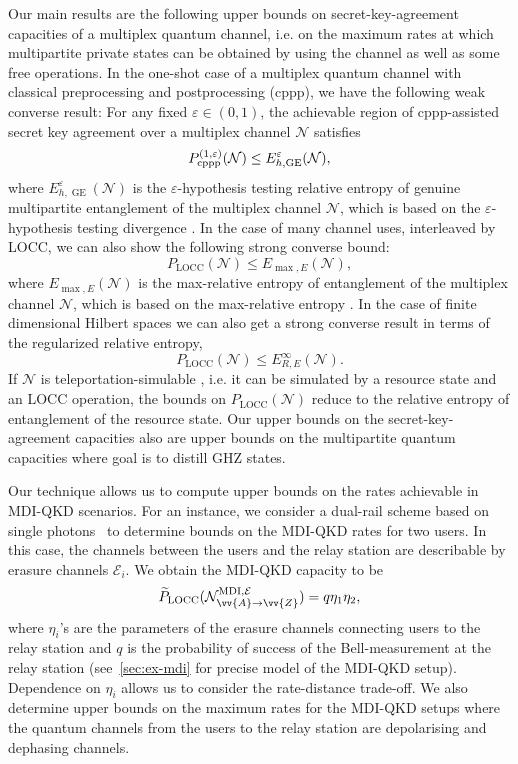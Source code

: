 \documentclass[aps,pra,twocolumn,superscriptaddress,longbibliography]{revtex4-1}
\def\GE{\operatorname{GE}}
\def\LOCC{\operatorname{LOCC}}
\newcommand{\mc}[1]{\mathcal{#1}}
\newcommand{\wt}[1]{\widetilde{#1}}
\begin{document}
Our main results are the following upper bounds  on secret-key-agreement capacities of a multiplex quantum channel, i.e. on the maximum rates at which multipartite private states can be obtained by using the channel as well as some free operations. In the one-shot case of a multiplex quantum channel with classical preprocessing and postprocessing (cppp), we have the following weak converse result: For any fixed $\varepsilon\in(0,1)$, the achievable region of cppp-assisted secret key agreement over a multiplex channel $\mc{N}$ satisfies 
\begin{equation}
P_{\textnormal{cppp}}^{(1,\varepsilon)}(\mc{N})\leq E^\varepsilon_{h,\GE}(\mc{N}),
\end{equation} 
where $E^\varepsilon_{h,\GE}(\mc{N})$ is the $\varepsilon$-hypothesis testing relative entropy of genuine multipartite entanglement of the multiplex channel $\mc{N}$, which is based on the $\varepsilon$-hypothesis testing divergence \cite{BD10}. In the case of many channel uses, interleaved by LOCC, we can also show the following strong converse bound:
\begin{equation}
P_{\LOCC}(\mc{N})\leq E_{\max,E}(\mc{N}), 
\end{equation}
where $E_{\max,E}(\mc{N})$ is the max-relative entropy of entanglement of the multiplex channel $\mc{N}$, which is based on the max-relative entropy \cite{Dat09}. In the case of finite dimensional Hilbert spaces we can also get a strong converse result in terms of the regularized relative entropy,
\begin{equation}
P_{\LOCC}(\mc{N})\leq E^{\infty}_{R,E}(\mc{N}).
\end{equation}
If $\mc{N}$ is teleportation-simulable \cite{BBPS96,PLOB15}, i.e. it can be simulated by a resource state and an LOCC operation, the bounds on $P_{\LOCC}(\mc{N})$ reduce to the relative entropy of entanglement of the resource state. Our upper bounds on the secret-key-agreement capacities also are upper bounds on the multipartite quantum capacities where goal is to distill GHZ states. 


Our technique allows us to compute upper bounds on the rates achievable in MDI-QKD scenarios. For an instance, we consider a dual-rail scheme based on single photons~\cite{DKD18} to determine bounds on the MDI-QKD rates for two users. In this case, the channels between the users and the relay station are describable by erasure channels $\mathcal{E}_i$. We obtain the MDI-QKD capacity to be
\begin{equation}
     \wt{P}_{\LOCC}(\mathcal{N}^{\text{MDI},\mathcal{E}}_{\vv{A}\to \vv{Z}})= q \eta_1\eta_2, 
    \end{equation}
where $\eta_i$'s are the parameters of the erasure channels connecting users to the relay station and $q$ is the probability of success of the Bell-measurement at the relay station (see~\ref{sec:ex-mdi} for precise model of the MDI-QKD setup). Dependence on $\eta_i$ allows us to consider the rate-distance trade-off. We also determine upper bounds on the maximum rates for the MDI-QKD setups where the quantum channels from the users to the relay station are depolarising and dephasing channels.
\end{document}
